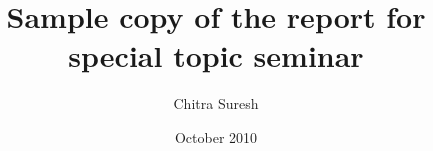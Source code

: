 \clearpage%

\title{Sample copy of the report for special topic seminar}
\author{Chitra Suresh }

\date{October 2010}



 \maketitle

